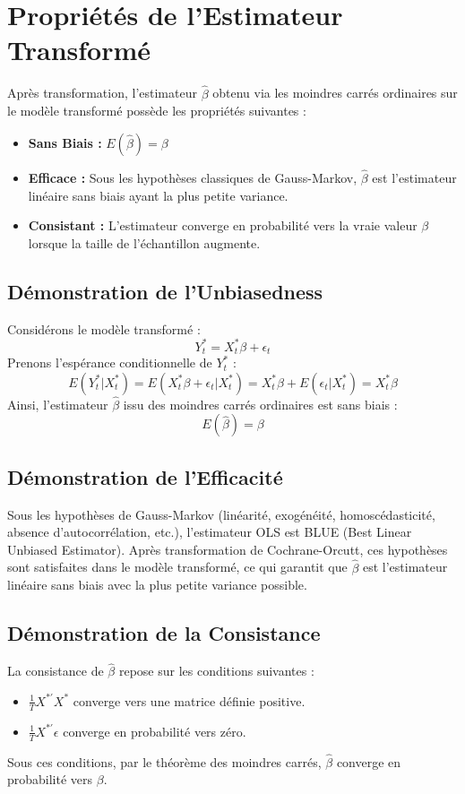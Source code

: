 \documentclass[14pt]{extarticle} %
\theoremstyle{definition}
\theoremstyle{plain}
\begin{document}
\section{Propriétés de l'Estimateur Transformé}
Après transformation, l'estimateur \( \hat{\beta} \) obtenu via les moindres carrés ordinaires sur le modèle transformé possède les propriétés suivantes :
\begin{itemize}
    \item \textbf{Sans Biais :} \( E(\hat{\beta}) = \beta \)
    \item \textbf{Efficace :} Sous les hypothèses classiques de Gauss-Markov, \( \hat{\beta} \) est l'estimateur linéaire sans biais ayant la plus petite variance.
    \item \textbf{Consistant :} L'estimateur converge en probabilité vers la vraie valeur \( \beta \) lorsque la taille de l'échantillon augmente.
\end{itemize}

\subsection{Démonstration de l'Unbiasedness}
Considérons le modèle transformé :
\[
Y_t^* = X_t^* \beta + \epsilon_t
\]
Prenons l'espérance conditionnelle de \( Y_t^* \) :
\[
E(Y_t^* | X_t^*) = E(X_t^* \beta + \epsilon_t | X_t^*) = X_t^* \beta + E(\epsilon_t | X_t^*) = X_t^* \beta
\]
Ainsi, l'estimateur \( \hat{\beta} \) issu des moindres carrés ordinaires est sans biais :
\[
E(\hat{\beta}) = \beta
\]

\subsection{Démonstration de l'Efficacité}
Sous les hypothèses de Gauss-Markov (linéarité, exogénéité, homoscédasticité, absence d'autocorrélation, etc.), l'estimateur OLS est BLUE (Best Linear Unbiased Estimator). Après transformation de Cochrane-Orcutt, ces hypothèses sont satisfaites dans le modèle transformé, ce qui garantit que \( \hat{\beta} \) est l'estimateur linéaire sans biais avec la plus petite variance possible.

\subsection{Démonstration de la Consistance}
La consistance de \( \hat{\beta} \) repose sur les conditions suivantes :
\begin{itemize}
    \item \( \frac{1}{T} X^{*'} X^* \) converge vers une matrice définie positive.
    \item \( \frac{1}{T} X^{*'} \epsilon \) converge en probabilité vers zéro.
\end{itemize}
Sous ces conditions, par le théorème des moindres carrés, \( \hat{\beta} \) converge en probabilité vers \( \beta \).
\end{document}
